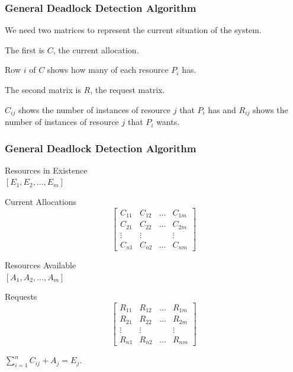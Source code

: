 \begin{frame}
\frametitle{General Deadlock Detection Algorithm}

We need two matrices to represent the current situation of the system. 

The first is $C$, the current allocation.

Row $i$ of $C$ shows how many of each resource $P_{i}$ has. 

The second matrix is $R$, the request matrix. 

$C_{ij}$ shows the number of instances of resource $j$ that $P_{i}$ has and $R_{ij}$ shows the number of instances of resource $j$ that $P_{i}$ wants.

\end{frame}

\begin{frame}
\frametitle{General Deadlock Detection Algorithm}

\begin{multicols}{2}
\begin{center}
\textsf{Resources in Existence}\\
$[E_{1}, E_{2}, ..., E_{m}]$\vspace{5em}

\textsf{Current Allocations}
\[
\left[ {\begin{array}{cccc}
C_{11} & C_{12} & ... & C_{1m} \\
C_{21} & C_{22} & ... & C_{2m} \\
\vdots & \vdots &     & \vdots \\
C_{n1} & C_{n2} & ... & C_{nm}
\end{array} } \right]
\]
\end{center}
\columnbreak

\begin{center}
\textsf{Resources Available}\\
$[A_{1}, A_{2}, ..., A_{m}]$\vspace{3em}

\textsf{Requests}
\[
\left[ {\begin{array}{cccc}
R_{11} & R_{12} & ... & R_{1m} \\
R_{21} & R_{22} & ... & R_{2m} \\
\vdots & \vdots &     & \vdots \\
R_{n1} & R_{n2} & ... & R_{nm}
\end{array} } \right]
\]
\end{center}

\end{multicols}

\begin{center}
$\sum\limits_{i=1}^n C_{ij} + A_{j} = E_{j}$.
\end{center}


\end{frame}

